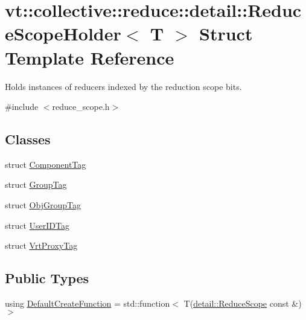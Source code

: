 \hypertarget{structvt_1_1collective_1_1reduce_1_1detail_1_1_reduce_scope_holder}{}\section{vt\+:\+:collective\+:\+:reduce\+:\+:detail\+:\+:Reduce\+Scope\+Holder$<$ T $>$ Struct Template Reference}
\label{structvt_1_1collective_1_1reduce_1_1detail_1_1_reduce_scope_holder}


Holds instances of reducers indexed by the reduction scope bits.  




{\ttfamily \#include $<$reduce\+\_\+scope.\+h$>$}

\subsection*{Classes}
\begin{DoxyCompactItemize}
\item 
struct \hyperlink{structvt_1_1collective_1_1reduce_1_1detail_1_1_reduce_scope_holder_1_1_component_tag}{Component\+Tag}
\item 
struct \hyperlink{structvt_1_1collective_1_1reduce_1_1detail_1_1_reduce_scope_holder_1_1_group_tag}{Group\+Tag}
\item 
struct \hyperlink{structvt_1_1collective_1_1reduce_1_1detail_1_1_reduce_scope_holder_1_1_obj_group_tag}{Obj\+Group\+Tag}
\item 
struct \hyperlink{structvt_1_1collective_1_1reduce_1_1detail_1_1_reduce_scope_holder_1_1_user_i_d_tag}{User\+I\+D\+Tag}
\item 
struct \hyperlink{structvt_1_1collective_1_1reduce_1_1detail_1_1_reduce_scope_holder_1_1_vrt_proxy_tag}{Vrt\+Proxy\+Tag}
\end{DoxyCompactItemize}
\subsection*{Public Types}
\begin{DoxyCompactItemize}
\item 
using \hyperlink{structvt_1_1collective_1_1reduce_1_1detail_1_1_reduce_scope_holder_ac1bca1874a023b11bdc3c26b165c3b20}{Default\+Create\+Function} = std\+::function$<$ T(\hyperlink{structvt_1_1collective_1_1reduce_1_1detail_1_1_reduce_scope}{detail\+::\+Reduce\+Scope} const  \&)$>$
\end{DoxyCompactItemize}
